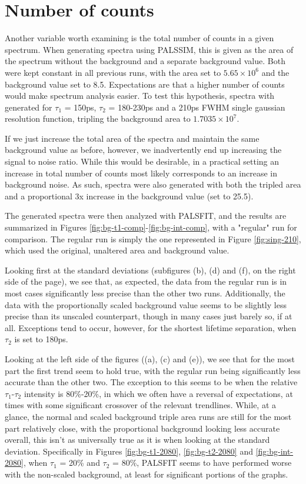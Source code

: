 \pagebreak

\section{Number of counts}

Another variable worth examining is the total number of counts in a given spectrum. When generating spectra using PALSSIM, this is given as the area of the spectrum without the background and a separate background value. Both were kept constant in all previous runs, with the area set to $5.65 \times 10^6$ and the background value set to 8.5. Expectations are that a higher number of counts would make spectrum analysis easier. To test this hypothesis, spectra with generated for $\tau_1$ = 150ps, $\tau_2$ = 180-230ps and a 210ps FWHM single gaussian resolution function, tripling the background area to $1.7035 \times 10^7$.

If we just increase the total area of the spectra and maintain the same background value as before, however, we inadvertently end up increasing the signal to noise ratio. While this would be desirable, in a practical setting an increase in total number of counts most likely corresponds to an increase in background noise. As such, spectra were also generated with both the tripled area and a proportional 3x increase in the background value (set to 25.5).

The generated spectra were then analyzed with PALSFIT, and the results are summarized in Figures \ref{fig:bg-t1-comp}-\ref{fig:bg-int-comp}, with a "regular" run for comparison. The regular run is simply the one represented in Figure \ref{fig:sing-210}, which used the original, unaltered area and background value.

Looking first at the standard deviations (subfigures (b), (d) and (f), on the right side of the page), we see that, as expected, the data from the regular run is in most cases significantly less precise than the other two runs. Additionally, the data with the proportionally scaled background value seems to be slightly less precise than its unscaled counterpart, though in many cases just barely so, if at all. Exceptions tend to occur, however, for the shortest lifetime separation, when $\tau_2$ is set to 180ps.

Looking at the left side of the figures ((a), (c) and (e)), we see that for the most part the first trend seem to hold true, with the regular run being significantly less accurate than the other two. The exception to this seems to be when the relative $\tau_1$-$\tau_2$ intensity is 80\%-20\%, in which we often have a reversal of expectations, at times with some significant crossover of the relevant trendlines. While, at a glance, the normal and scaled background triple area runs are still for the most part relatively close, with the proportional background looking less accurate overall, this isn't as universally true as it is when looking at the standard deviation. Specifically in Figures \ref{fig:bg-t1-2080}, \ref{fig:bg-t2-2080} and \ref{fig:bg-int-2080}, when $\tau_1$ = 20\% and $\tau_2$ = 80\%, PALSFIT seems to have performed worse with the non-scaled background, at least for significant portions of the graphs.

